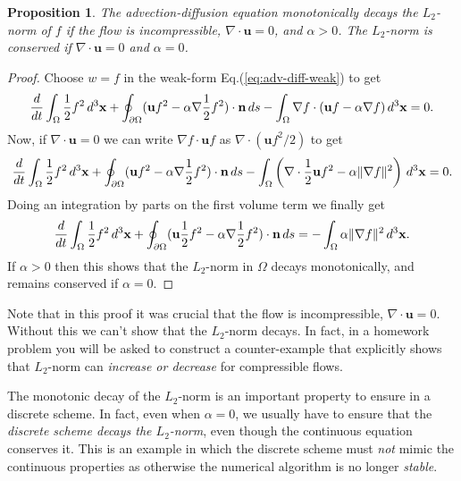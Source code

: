\documentclass[12pt]{article}
\newtheorem{proposition}{Proposition}
\theoremstyle{definition}
\theoremstyle{definition}
\theoremstyle{definition}
\newcommand{\eqr}[1]{Eq.\thinspace(#1)}
\newcommand{\mvec}[1]{\mathbf{#1}}
\newcommand{\gcn}{\nabla}
\newcommand{\dvol}{\thinspace d^3\mvec{x}}
\newcommand{\dsurf}{\thinspace ds}
\begin{document}
\begin{proposition}
  The advection-diffusion equation monotonically decays the $L_2$-norm
  of $f$ if the flow is incompressible, $\gcn\cdot\mvec{u} = 0$, and
  $\alpha > 0$. The $L_2$-norm is conserved if $\gcn\cdot\mvec{u} =
  0$ and $\alpha = 0$.
\end{proposition}
\begin{proof}
  Choose $w=f$ in the weak-form \eqr{\ref{eq:adv-diff-weak}} to get
\begin{align*}
  \frac{d}{dt}\int_\Omega \frac{1}{2}f^2 \dvol
  +
  \oint_{\partial\Omega}
  (\mvec{u} f^2 - \alpha \gcn \frac{1}{2} f^2)\cdot \mvec{n} \dsurf
  -
  \int_\Omega \gcn f \cdot (\mvec{u} f - \alpha \gcn f)  \dvol
  =
  0.
\end{align*}
Now, if $\gcn\cdot\mvec{u} = 0$ we can write $\gcn f \cdot \mvec{u} f$
as $\gcn\cdot(\mvec{u} f^2/2)$ to get
\begin{align*}
  \frac{d}{dt}\int_\Omega \frac{1}{2}f^2 \dvol
  +
  \oint_{\partial\Omega}
  (\mvec{u} f^2 - \alpha \gcn \frac{1}{2} f^2)\cdot \mvec{n} \dsurf
  -
  \int_\Omega \left(\gcn\cdot\frac{1}{2}\mvec{u} f^2 - \alpha 
  \| \gcn  f \|^2
  \right)  \dvol
  =
  0.
\end{align*}
Doing an integration by parts on the first volume term we finally get
\begin{align}
  \frac{d}{dt}\int_\Omega \frac{1}{2}f^2 \dvol
  +
  \oint_{\partial\Omega}
  (\mvec{u} \frac{1}{2} f^2 - \alpha \gcn \frac{1}{2} f^2)\cdot  \mvec{n} \dsurf
  =
  -
  \int_\Omega \alpha \| \gcn  f \|^2 \dvol.
\end{align}
If $\alpha > 0$ then this shows that the $L_2$-norm in $\Omega$ decays
monotonically, and remains conserved if $\alpha = 0$.
\end{proof}

Note that in this proof it was crucial that the flow is incompressible,
$\gcn\cdot\mvec{u} = 0$. Without this we can't show that the
$L_2$-norm decays. In fact, in a homework problem you will be asked to
construct a counter-example that explicitly shows that $L_2$-norm can
\emph{increase or decrease} for compressible flows.

The monotonic decay of the $L_2$-norm is an important property to
ensure in a discrete scheme. In fact, even when $\alpha=0$, we usually
have to ensure that the \emph{discrete scheme decays the $L_2$-norm},
even though the continuous equation conserves it. This is an example
in which the discrete scheme must \emph{not} mimic the continuous
properties as otherwise the numerical algorithm is no longer
\emph{stable}.
\end{document}
